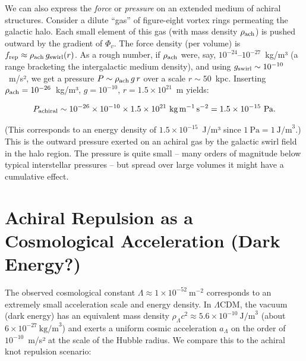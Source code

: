 \documentclass[11pt]{article}
\begin{document}
We can also express the \textit{force} or \textit{pressure} on an extended medium of achiral structures. Consider a dilute “gas” of figure-eight vortex rings permeating the galactic halo. Each small element of this gas (with mass density $\rho_{\rm ach}$) is pushed outward by the gradient of $\Phi_v$. The force density (per volume) is $f_{\rm rep} \approx \rho_{\rm ach} \, g_{\rm swirl}(r)$. As a rough number, if $\rho_{\rm ach}$ were, say, $10^{-24}$–$10^{-27}$~kg/m³ (a range bracketing the intergalactic medium density), and using $g_{\rm swirl}\sim10^{-10}$~m/s², we get a pressure $P \sim \rho_{\rm ach} \, g \, r$ over a scale $r\sim50$~kpc. Inserting $\rho_{\rm ach}=10^{-26}$~kg/m³, $g=10^{-10}$, $r=1.5\times10^{21}$~m yields:

\[
P_{\rm achiral} \sim 10^{-26}\times10^{-10}\times1.5\times10^{21}~\text{kg}\,\text{m}^{-1}\,\text{s}^{-2} = 1.5\times10^{-15}~\text{Pa}.
\]

(This corresponds to an energy density of $1.5\times10^{-15}$~J/m³ since $1~\text{Pa}=1~\text{J/m}^3$.) This is the outward pressure exerted on an achiral gas by the galactic swirl field in the halo region. The pressure is quite small – many orders of magnitude below typical interstellar pressures – but spread over large volumes it might have a cumulative effect.


\section*{Achiral Repulsion as a Cosmological Acceleration (Dark Energy?)}

The observed cosmological constant $\Lambda \approx 1\times10^{-52}~\text{m}^{-2}$ corresponds to an extremely small acceleration scale and energy density. In $\Lambda$CDM, the vacuum (dark energy) has an equivalent mass density $\rho_\Lambda c^2 \approx 5.6\times10^{-10}~\text{J/m}^3$ (about $6\times10^{-27}~\text{kg/m}^3$) and exerts a uniform cosmic acceleration $a_\Lambda$ on the order of $10^{-10}$~m/s² at the scale of the Hubble radius. We compare this to the achiral knot repulsion scenario:
\end{document}
